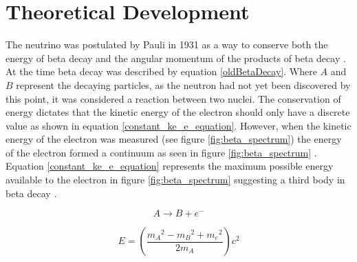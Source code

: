 \section{Theoretical Development}
The neutrino was postulated by Pauli in 1931 as a way to conserve both the energy of beta decay and the angular momentum of the products of beta decay  \cite{griffiths2008neutrino1.5}\cite{lederman1970resource}. At the time beta decay was described by equation \ref{oldBetaDecay}. Where $A$ and $B$ represent the decaying particles, as the neutron had not yet been discovered by this point, it was considered a reaction between two nuclei. The conservation of energy dictates that the kinetic energy of the electron should only have a discrete value as shown in equation \ref{constant_ke_e_equation}. However, when the kinetic energy of the electron was measured (see figure \ref{fig:beta_spectrum}) the energy of the electron formed a continuum as seen in figure \ref{fig:beta_spectrum}  \cite{griffiths2008neutrino1.5} \cite{lewis1970neutrinos}. Equation \ref{constant_ke_e_equation} represents the maximum possible energy available to the electron in figure \ref{fig:beta_spectrum} suggesting a third body in beta decay  \cite{griffiths2008neutrino1.5}.


\begin{equation}
    A \rightarrow B + e^-
    \label{oldBetaDecay}
\end{equation}

\begin{equation}
    E = \left( \frac{{m_A}^2 - {m_B}^2 + {m_e}^2}{2m_A}\right) c^2
    \label{constant_ke_e_equation}
\end{equation}

